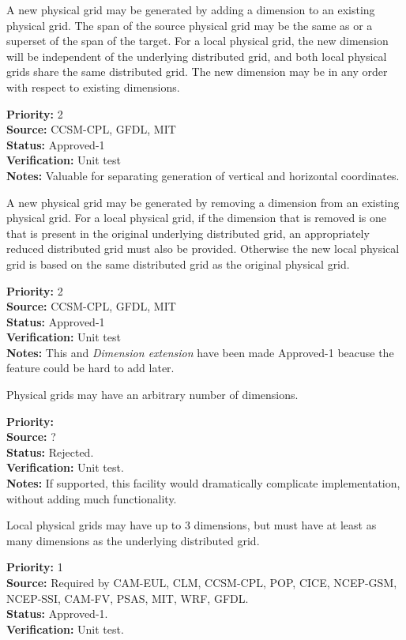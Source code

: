 A new physical grid may be generated by adding a dimension to an existing 
physical grid.  The span of the source physical grid may be the same as or a superset of
the span of the target.  For a local physical grid, the new dimension will be independent 
of the underlying distributed grid, and both local physical grids share the same 
distributed grid.  The new dimension may be in any order with respect to existing dimensions.
\begin{reqlist}
{\bf Priority:} 2 \\
{\bf Source:} CCSM-CPL, GFDL, MIT \\
{\bf Status:} Approved-1 \\
{\bf Verification:} Unit test\\
{\bf Notes:} Valuable for separating generation of vertical and horizontal
coordinates.
\end{reqlist}

A new physical grid may be generated by removing a dimension from an existing physical grid.
For a local physical grid, if the dimension that is removed is one that is present 
in the original underlying distributed grid, an appropriately reduced distributed 
grid must also be provided.  Otherwise the new local physical
grid is based on the same distributed grid as the original physical grid.
\begin{reqlist}
{\bf Priority:} 2 \\
{\bf Source:} CCSM-CPL, GFDL, MIT \\
{\bf Status:} Approved-1 \\
{\bf Verification:} Unit test\\
{\bf Notes:} This and {\it Dimension extension} have been made
Approved-1 beacuse the feature could be hard to add later.
\end{reqlist}

Physical grids may have an arbitrary number of dimensions. 
\begin{reqlist}
{\bf Priority:} \\
{\bf Source:} ? \\
{\bf Status:} Rejected.\\
{\bf Verification:} Unit test.\\
{\bf Notes:} If supported, this facility would dramatically complicate implementation,
without adding much functionality.
\end{reqlist}

Local physical grids may have up to 3 dimensions, but must have at least as many dimensions as the
underlying distributed grid. 
\begin{reqlist}
{\bf Priority:}  1\\
{\bf Source:} Required by CAM-EUL, CLM, CCSM-CPL, POP, CICE, NCEP-GSM, NCEP-SSI,
              CAM-FV, PSAS, MIT, WRF, GFDL. \\
{\bf Status:} Approved-1. \\
{\bf Verification:} Unit test.\\
\end{reqlist}


